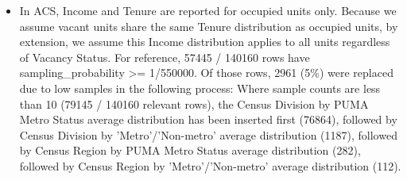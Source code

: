 \begin{itemize}
\item In ACS, Income and Tenure are reported for occupied units only. Because we assume vacant units share the same Tenure distribution as occupied units, by extension, we assume this Income distribution applies to all units regardless of Vacancy Status. For reference, 57445 / 140160 rows have sampling\_probability >= 1/550000. Of those rows, 2961 (5\%) were replaced due to low samples in the following process: Where sample counts are less than 10 (79145 / 140160 relevant rows), the Census Division by PUMA Metro Status average distribution has been inserted first (76864), followed by Census Division by 'Metro'/'Non-metro' average distribution (1187), followed by Census Region by PUMA Metro Status average distribution (282), followed by Census Region by 'Metro'/'Non-metro' average distribution (112).
\end{itemize}
